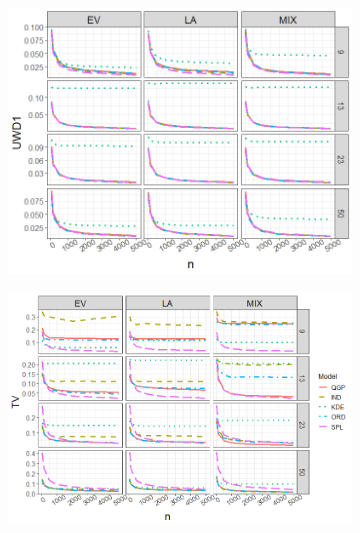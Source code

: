 \documentclass[preprint,12pt,authoryear]{elsarticle}
\begin{document}
\begin{figure}[ht!]
\begin{subfigure}{.456\linewidth}
  \includegraphics[width=\linewidth]{Images/uk_uwd1.png}
\end{subfigure}\hfill %
\begin{subfigure}{.52\linewidth}
  \includegraphics[width=\linewidth]{Images/uk_tv.png}
\end{subfigure}


\end{figure}
\end{document}
